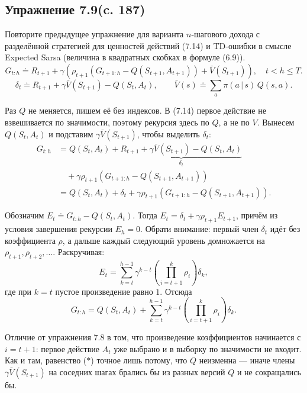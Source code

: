 \subsection{Упражнение 7.9(c. 187)}
Повторите предыдущее упражнение для варианта $n$-шагового дохода с разделённой
стратегией для ценностей действий (7.14) и TD-ошибки в смысле Expected Sarsa
(величина в квадратных скобках в формуле (6.9)).
\begin{equation}
    G_{t:h} \doteq R_{t+1} + \gamma\left(\rho_{t+1}\left(G_{t+1:h} - Q(S_{t+1}, A_{t+1})\right)
    + \bar{V}(S_{t+1})\right), \quad t < h \le T.
    \tag{7.14}
\end{equation}
\begin{equation}
    \delta_t \doteq R_{t+1} + \gamma\bar{V}(S_{t+1}) - Q(S_t, A_t),
    \qquad \bar{V}(s) \doteq \sum_a \pi(a\,|\,s)\,Q(s, a).
    \tag{6.9}
\end{equation}
\begin{solution}
    Раз $Q$ не меняется, пишем её без индексов. В (7.14) первое действие не
    взвешивается по значимости, поэтому рекурсия здесь по $Q$, а не по $V$.
    Вынесем $Q(S_t, A_t)$ и подставим $\gamma\bar V(S_{t+1})$, чтобы выделить $\delta_t$:
    \begin{align*}
        G_{t:h}
        &= Q(S_t, A_t)
        + \underbrace{R_{t+1} + \gamma\bar V(S_{t+1}) - Q(S_t, A_t)}_{\delta_t}\\
        &\quad + \gamma\rho_{t+1}\left(G_{t+1:h} - Q(S_{t+1}, A_{t+1})\right)\\
        &= Q(S_t, A_t) + \delta_t
        + \gamma\rho_{t+1}\left(G_{t+1:h} - Q(S_{t+1}, A_{t+1})\right).
    \end{align*}

    Обозначим $E_t \doteq G_{t:h} - Q(S_t, A_t)$. Тогда $E_t = \delta_t + \gamma\rho_{t+1}E_{t+1}$,
    причём из условия завершения рекурсии $E_h = 0$. Обрати внимание: первый член
    $\delta_t$ идёт без коэффициента $\rho$, а дальше каждый следующий уровень
    домножается на $\rho_{t+1}, \rho_{t+2}, \dots$. Раскручивая:
    \begin{equation*}
        E_t = \sum_{k=t}^{h-1} \gamma^{k-t}\left(\prod_{i=t+1}^{k}\rho_i\right)\delta_k,
    \end{equation*}
    где при $k=t$ пустое произведение равно $1$. Отсюда
    \begin{equation}
        G_{t:h} = Q(S_t, A_t) + \sum_{k=t}^{h-1}
        \gamma^{k-t}\left(\prod_{i=t+1}^{k}\rho_i\right)\delta_k.
        \tag{$\ast$}
    \end{equation}

    Отличие от упражнения 7.8 в том, что произведение коэффициентов начинается с
    $i=t+1$: первое действие $A_t$ уже выбрано и в выборку по значимости не входит.
    Как и там, равенство ($\ast$) точное лишь потому, что $Q$ неизменна --- иначе
    члены $\gamma\bar V(S_{t+1})$ на соседних шагах брались бы из разных версий $Q$
    и не сокращались бы.
\end{solution}

